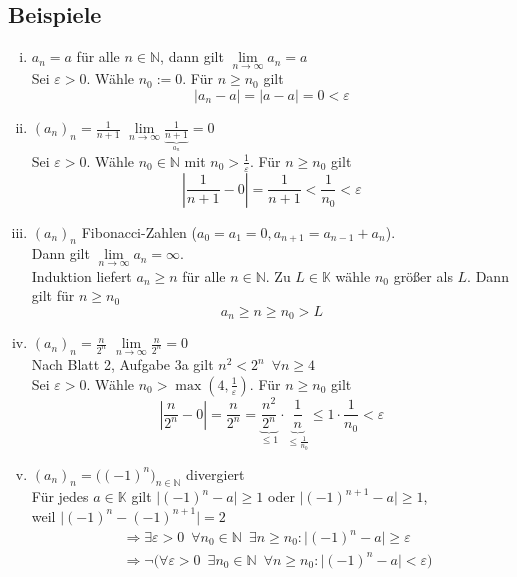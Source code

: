 \subsection{Beispiele} %
\label{sub:beispiele}
\begin{enumerate}[(i)]
	\item $a_n = a$ für alle $n \in \mathds{N}$, dann gilt $\lim\limits_{n \to \infty} a_n = a$ \\
	Sei $\varepsilon > 0$. Wähle $n_0 := 0$. Für $n \geq n_0$ gilt
	\[
		|a_n -a| = |a-a| = 0 < \varepsilon
	\]
	\item $(a_n)_n = \frac{1}{n+1}$ \quad \quad $\lim\limits_{n \to \infty} \frac{1}{\underbrace{n+1}_{a_n}} = 0$ \\
	Sei $\varepsilon > 0$. Wähle $n_0 \in \mathds{N}$ mit $n_0 > \frac{1}{\varepsilon}$. Für $n \geq n_0$ gilt
	\[
		\left| \frac{1}{n+1}-0 \right| = \frac{1}{n+1} < \frac{1}{n_0} < \varepsilon
	\]
	\item $(a_n)_n$ Fibonacci-Zahlen ($a_0 = a_1 = 0 , a_{n+1}= a_{n-1} + a_n$). \\
	Dann gilt $\lim\limits_{n \to \infty} a_n = \infty$.
	\vspace{\baselineskip} \\
	Induktion liefert $a_n  \geq n$ für alle $n \in \mathds{N}$. Zu $L \in \mathds{K}$ wähle $n_0$ größer als $L$. Dann gilt für $n \geq n_0$
	\[
		a_n \geq n \geq n_0 > L
	\]
	\item $(a_n)_n = \frac{n}{2^n}$ \quad \quad $\lim\limits_{n \to \infty} \frac{n}{2^n} = 0$
	\vspace{\baselineskip} \\
	Nach Blatt 2, Aufgabe 3a gilt $n^2 < 2^n \enspace \forall n \geq 4$ \\
	Sei $\varepsilon >0$. Wähle $n_0 > \max (4, \frac{1}{\varepsilon})$. Für $n \geq n_0$ gilt
	\[
		\left| \frac{n}{2^n} -0 \right| = \frac{n}{2^n} 
		= \underbrace{\frac{n^2}{2^n}}_{\leq 1} \cdot \underbrace{\frac{1}{n}}_{\leq \frac{1}{n_0}} \leq 1  \cdot \frac{1}{n_0} < \varepsilon
	\]
	\item $(a_n)_n = \big( (-1)^n \big)_{n \in \mathds{N}}$ divergiert
	\vspace{\baselineskip} \\
	Für jedes $a \in \mathds{K}$ gilt $\big| (-1)^n -a \big| \geq 1$ oder $\big| (-1)^{n+1} -a \big| \geq 1$, \\
	weil $\big| (-1)^n - (-1)^{n+1}\big| = 2$
	\begin{align*}
		&\Rightarrow \exists \varepsilon > 0 \enspace \forall n_0 \in \mathds{N} \enspace \exists n \geq n_0 
		: \big| (-1)^n - a \big| \geq \varepsilon \\
		&\Rightarrow \neg \Big(\forall \varepsilon > 0 \enspace \exists n_0 \in \mathds{N} \enspace \forall n \geq n_0 
		: \big| (-1)^n - a\big| < \varepsilon \Big)
	\end{align*}
 \end{enumerate}

